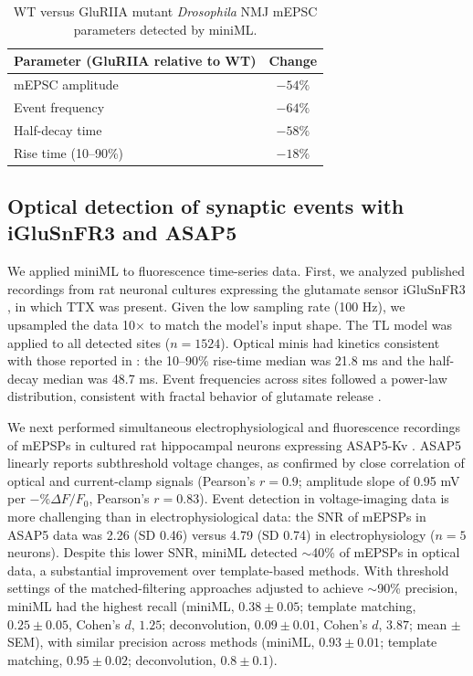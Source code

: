 \documentclass[9pt,lineno]{article}
\begin{document}
\begin{table}[ht]
\centering
\caption{WT versus GluRIIA mutant \textit{Drosophila} NMJ mEPSC parameters detected by miniML.}
\label{tab:drosophila}
\begin{tabular}{lc}
\toprule
Parameter (GluRIIA relative to WT) & Change \\
\midrule
mEPSC amplitude & $-54\%$ \\
Event frequency & $-64\%$ \\
Half-decay time & $-58\%$ \\
Rise time (10--90\%) & $-18\%$ \\
\bottomrule
\end{tabular}
\end{table}

\subsection{Optical detection of synaptic events with iGluSnFR3 and ASAP5}

We applied miniML to fluorescence time-series data. First, we analyzed published recordings from rat neuronal cultures expressing the glutamate sensor iGluSnFR3 \citep{Aggarwal2023}, in which TTX was present. Given the low sampling rate (100 Hz), we upsampled the data 10$\times$ to match the model's input shape. The TL model was applied to all detected sites ($n = 1524$). Optical minis had kinetics consistent with those reported in \citet{Aggarwal2023}: the 10--90\% rise-time median was 21.8 ms and the half-decay median was 48.7 ms. Event frequencies across sites followed a power-law distribution, consistent with fractal behavior of glutamate release \citep{Lowen1997}.

We next performed simultaneous electrophysiological and fluorescence recordings of mEPSPs in cultured rat hippocampal neurons expressing ASAP5-Kv \citep{Hao2024}. ASAP5 linearly reports subthreshold voltage changes, as confirmed by close correlation of optical and current-clamp signals (Pearson's $r = 0.9$; amplitude slope of 0.95 mV per $-\%\Delta F/F_0$, Pearson's $r = 0.83$). Event detection in voltage-imaging data is more challenging than in electrophysiological data: the SNR of mEPSPs in ASAP5 data was 2.26 (SD 0.46) versus 4.79 (SD 0.74) in electrophysiology ($n = 5$ neurons). Despite this lower SNR, miniML detected $\sim$40\% of mEPSPs in optical data, a substantial improvement over template-based methods. With threshold settings of the matched-filtering approaches adjusted to achieve $\sim$90\% precision, miniML had the highest recall (miniML, $0.38 \pm 0.05$; template matching, $0.25 \pm 0.05$, Cohen's $d$, $1.25$; deconvolution, $0.09 \pm 0.01$, Cohen's $d$, $3.87$; mean $\pm$ SEM), with similar precision across methods (miniML, $0.93 \pm 0.01$; template matching, $0.95 \pm 0.02$; deconvolution, $0.8 \pm 0.1$).
\end{document}
